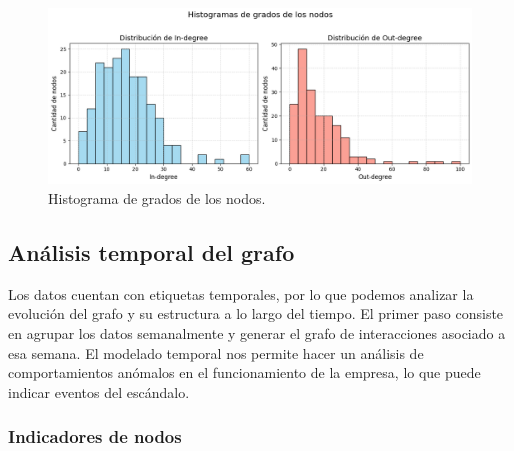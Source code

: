 \documentclass{article}
\begin{document}
\begin{figure}[htb]
    \centering
    \includegraphics[width=0.8\linewidth]{imagenes/ej1/histogramas_grados_nodos.png}
    \caption{Histograma de grados de los nodos.}
    \label{fig:histogramas_grados}
\end{figure}

\subsection{Análisis temporal del grafo}
Los datos cuentan con etiquetas temporales, por lo que podemos analizar la evolución del grafo y su estructura a lo largo del tiempo. El primer paso consiste en
agrupar los datos semanalmente y generar el grafo de interacciones asociado a esa semana.  El modelado temporal nos permite hacer un análisis de comportamientos
anómalos en el funcionamiento de la empresa, lo que puede indicar eventos del escándalo.

\subsubsection{Indicadores de nodos}
\end{document}

